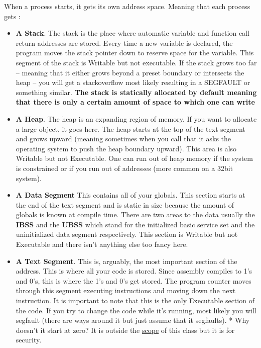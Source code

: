 When a process starts, it gets its own address space. Meaning that each process gets : 
\begin{itemize}
\item \textbf{A Stack}. The stack is the place where automatic variable and function call return addresses are stored. Every time a new variable is declared, the program moves the stack pointer down to reserve space for the variable. This segment of the stack is Writable but not executable. If the stack grows too far -- meaning that it either grows beyond a preset boundary or intersects the heap -- you will get a stackoverflow most likely resulting in a SEGFAULT or something similar. \textbf{The stack is statically allocated by default meaning that there is only a certain amount of space to which one can write} 
\item \textbf{A Heap}. The heap is an expanding region of memory. If you want to allocate a large object, it goes here. The heap starts at the top of the text segment and grows upward (meaning sometimes when you call  that it asks the operating system to push the heap boundary upward). This area is also Writable but not Executable. One can run out of heap memory if the system is constrained or if you run out of addresses (more common on a 32bit system). 
\item \textbf{A Data Segment} This contains all of your globals. This section starts at the end of the text segment and is static in size because the amount of globals is known at compile time. There are two areas to the data usually the \textbf{IBSS} and the \textbf{UBSS} which stand for the initialized basic service set and the uninitialized data segment respectively. This section is Writable but not Executable and there isn't anything else too fancy here. 
\item \textbf{A Text Segment}. This is, arguably, the most important section of the address. This is where all your code is stored. Since assembly compiles to 1's and 0's, this is where the 1's and 0's get stored. The program counter moves through this segment executing instructions and moving down the next instruction. It is important to note that this is the only Executable section of the code. If you try to change the code while it's running, most likely you will segfault (there are ways around it but just assume that it segfaults). * Why doesn't it start at zero? It is outside the \href{https://en.wikipedia.org/wiki/Address_space_layout_randomization}{scope} of this class but it is for security.
\end{itemize}

